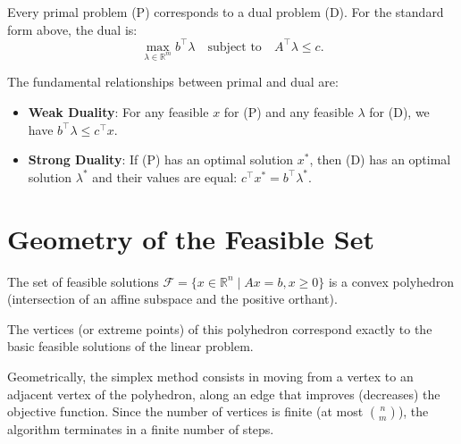 Every primal problem (P) corresponds to a dual problem (D). For the standard form above, the dual is:
\begin{equation}
    \max_{\lambda \in \mathbb{R}^m} b^\top \lambda \quad \text{subject to} \quad A^\top \lambda \leq c.
\end{equation}

The fundamental relationships between primal and dual are:
\begin{itemize}
    \item \textbf{Weak Duality}: For any feasible $x$ for (P) and any feasible $\lambda$ for (D), we have $b^\top \lambda \leq c^\top x$.
    \item \textbf{Strong Duality}: If (P) has an optimal solution $x^*$, then (D) has an optimal solution $\lambda^*$ and their values are equal: $c^\top x^* = b^\top \lambda^*$.
\end{itemize}

\section{Geometry of the Feasible Set}

The set of feasible solutions $\mathcal{F} = \{ x \in \mathbb{R}^n \mid Ax = b, x \geq 0 \}$ is a convex polyhedron (intersection of an affine subspace and the positive orthant).

\begin{proposition}
    The vertices (or extreme points) of this polyhedron correspond exactly to the basic feasible solutions of the linear problem.
\end{proposition}

Geometrically, the simplex method consists in moving from a vertex to an adjacent vertex of the polyhedron, along an edge that improves (decreases) the objective function.
Since the number of vertices is finite (at most $\binom{n}{m}$), the algorithm terminates in a finite number of steps.

